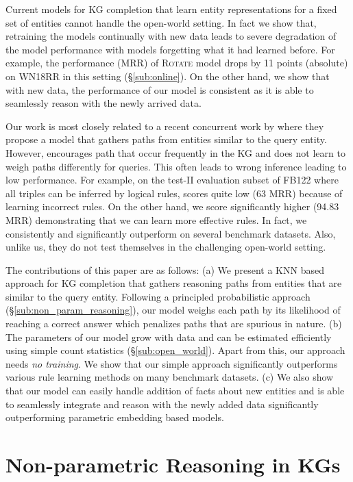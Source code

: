 \documentclass[11pt,a4paper]{article}
\newcommand{\fb}{FB122\xspace}
\newcommand{\wn}{WN18RR\xspace}
\begin{document}
Current models for KG completion that learn entity representations for a fixed set of entities cannot handle the open-world setting. In fact we show that, retraining the models continually with new data leads to severe degradation of the model performance with models forgetting what it had learned before.  For example, the performance (MRR) of \textsc{Rotate} model \cite{sun2019rotate} drops by 11 points (absolute) on \wn in this setting (\S\ref{sub:online}). On the other hand, we show that with new data, the performance of our model is consistent as it is able to seamlessly reason with the newly arrived data.


Our work is most closely related to a recent concurrent work by \citet{cbr} where they propose a model that gathers paths from entities similar to the query entity. However, \citet{cbr} encourages path that occur frequently in the KG and does not learn to weigh paths differently for queries.  This often leads to wrong inference leading to low performance. For example,  on the test-II evaluation subset of \fb where all triples can be inferred by logical rules,  \citet{cbr} scores quite low (63 MRR) because of learning incorrect rules. On the other hand, we score significantly higher (94.83 MRR) demonstrating that we can learn more effective rules. In fact, we consistently and significantly outperform \citet{cbr} on several benchmark datasets. Also, unlike us, they do not test themselves in the challenging open-world setting. 


The contributions of this paper are as follows: (a) We present a KNN based approach for KG completion that gathers reasoning paths from entities that are similar to the query entity. Following a principled probabilistic approach (\S\ref{sub:non_param_reasoning}), our model weighs each path by its likelihood of reaching a correct answer which penalizes paths that are spurious in nature. (b) The parameters of our model grow with data and can be estimated efficiently using simple count statistics (\S\ref{sub:open_world}). Apart from this, our approach needs \emph{no training}. We show that our simple approach significantly outperforms various rule learning methods \cite{das2018go,minervini2019differentiable,cbr} on many benchmark datasets. (c) We also show that our model can easily handle addition of facts about new entities and is able to seamlessly integrate and reason with the newly added data significantly outperforming parametric embedding based models.

 \section{Non-parametric Reasoning in KGs}
\label{sec:model}
\end{document}
